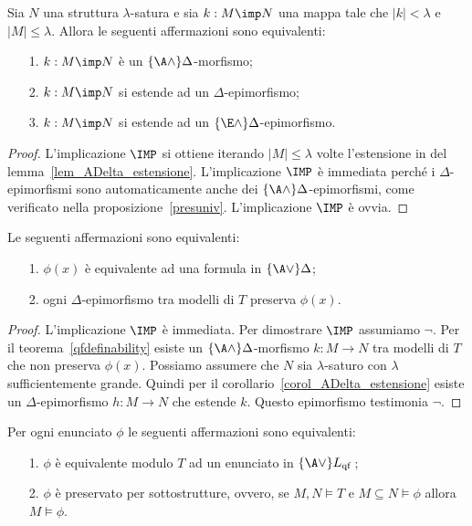 \begin{corollary}\label{corol_ADelta_estensione}
Sia $N$ una struttura $\lambda$-satura e sia $k:M\imp N$ una mappa tale che $|k|<\lambda$ e $|M|\le\lambda$. Allora le seguenti affermazioni sono equivalenti:
\begin{itemize}
\item[1.] $k:M\imp N$ \`e un $\{\A\wedge\}\Delta$-morfismo;
\item[2.] $k:M\imp N$ si estende ad un $\Delta$-epimorfismo;
\item[3.] $k:M\imp N$ si estende ad un $\{\E\wedge\}\Delta$-epimorfismo.
\end{itemize}
\end{corollary}
\begin{proof}
L'implicazione $\IMP$ si ottiene iterando $|M|\le\lambda$ volte l'estensione in  del lemma~\ref{lem_ADelta_estensione}. L'implicazione $\IMP$ \`e immediata perch\'e i $\Delta$-epimorfismi sono automaticamente anche dei $\{\A\wedge\}\Delta$-epimorfismi, come verificato nella proposizione~\ref{presuniv}. L'implicazione $\IMP$ \`e ovvia.
\end{proof}



\begin{theorem}
Le seguenti affermazioni sono equivalenti:
\begin{itemize}
\item[1.] $\phi(x)$ \`e equivalente ad una formula in $\{\A\vee\}\Delta$;
\item[2.] ogni $\Delta$-epimorfismo tra modelli di $T$ preserva $\phi(x)$.
\end{itemize}
\end{theorem}
\begin{proof}
L'implicazione $\IMP$ \`e immediata. Per dimostrare  $\IMP$ assumiamo $\neg$. Per il teorema~\ref{qfdefinability} esiste un $\{\A\wedge\}\Delta$-morfismo $k:M\to N$ tra modelli di $T$ che non preserva $\phi(x)$. Possiamo assumere che $N$ sia $\lambda$-saturo con $\lambda$ sufficientemente grande. Quindi per il corollario~\ref{corol_ADelta_estensione} esiste un $\Delta$-epimorfismo $h:M\to N$ che estende $k$. Questo epimorfismo testimonia $\neg$.
\end{proof}



\begin{exercise}
Per ogni enunciato $\phi$ le seguenti affermazioni sono equivalenti:
\begin{itemize}
\item[1.] $\phi$ \`e equivalente modulo $T$ ad un enunciato in $\{\A\vee\}L_{\rm qf}$\,;
\item[2.] $\phi$ \`e preservato per sottostrutture, ovvero, se $M,N\models T$ e $M\subseteq N\models \phi$ allora $M\models\phi$.\QED
\end{itemize}
\end{exercise}











